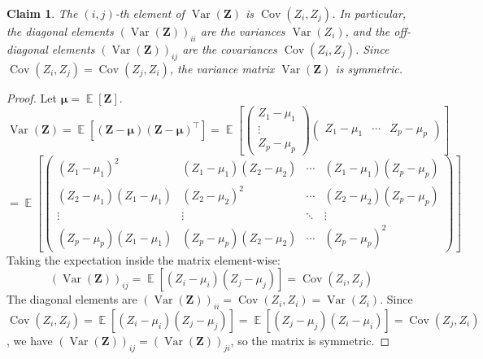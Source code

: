 \documentclass[11pt, a4paper]{article}
\DeclareMathOperator{\E}{\mathbb{E}}             %
\DeclareMathOperator{\Var}{\mathrm{Var}}         %
\DeclareMathOperator{\Cov}{\mathrm{Cov}}         %
\newtheorem{claim}[theorem]{Claim} %
\theoremstyle{definition}
\theoremstyle{remark}
\newcommand{\vect}[1]{\bm{#1}}          %
\newcommand{\transpose}{^{\top}}        %
\begin{document}
\begin{claim}
The $(i, j)$-th element of $\Var(\vect{Z})$ is $\Cov(Z_i, Z_j)$. In particular, the diagonal elements $(\Var(\vect{Z}))_{ii}$ are the variances $\Var(Z_i)$, and the off-diagonal elements $(\Var(\vect{Z}))_{ij}$ are the covariances $\Cov(Z_i, Z_j)$. Since $\Cov(Z_i, Z_j) = \Cov(Z_j, Z_i)$, the variance matrix $\Var(\vect{Z})$ is symmetric.
\end{claim}
\begin{proof}
Let $\vect{\mu} = \E[\vect{Z}]$.
\[ \Var(\vect{Z}) = \E \left[ (\vect{Z} - \vect{\mu}) (\vect{Z} - \vect{\mu})\transpose \right] = \E \left[ \begin{pmatrix} Z_1 - \mu_1 \\ \vdots \\ Z_p - \mu_p \end{pmatrix} \begin{pmatrix} Z_1 - \mu_1 & \cdots & Z_p - \mu_p \end{pmatrix} \right] \]
\[ = \E \left[ \begin{pmatrix} (Z_1 - \mu_1)^2 & (Z_1 - \mu_1)(Z_2 - \mu_2) & \cdots & (Z_1 - \mu_1)(Z_p - \mu_p) \\ (Z_2 - \mu_1)(Z_1 - \mu_1) & (Z_2 - \mu_2)^2 & \cdots & (Z_2 - \mu_2)(Z_p - \mu_p) \\ \vdots & \vdots & \ddots & \vdots \\ (Z_p - \mu_p)(Z_1 - \mu_1) & (Z_p - \mu_p)(Z_2 - \mu_2) & \cdots & (Z_p - \mu_p)^2 \end{pmatrix} \right] \]
Taking the expectation inside the matrix element-wise:
\[ (\Var(\vect{Z}))_{ij} = \E[(Z_i - \mu_i)(Z_j - \mu_j)] = \Cov(Z_i, Z_j) \]
The diagonal elements are $(\Var(\vect{Z}))_{ii} = \Cov(Z_i, Z_i) = \Var(Z_i)$.
Since $\Cov(Z_i, Z_j) = \E[(Z_i - \mu_i)(Z_j - \mu_j)] = \E[(Z_j - \mu_j)(Z_i - \mu_i)] = \Cov(Z_j, Z_i)$, we have $(\Var(\vect{Z}))_{ij} = (\Var(\vect{Z}))_{ji}$, so the matrix is symmetric.
\end{proof}
\end{document}
